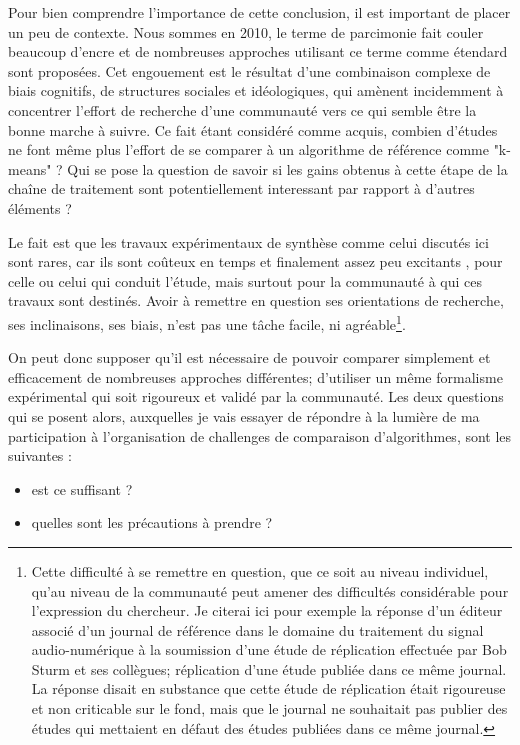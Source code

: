 Pour bien comprendre l'importance de cette conclusion, il est important de placer un peu de contexte. Nous sommes en 2010, le terme de parcimonie fait couler beaucoup d'encre et de nombreuses approches utilisant ce terme comme étendard sont proposées. Cet engouement est le résultat d'une combinaison complexe de biais cognitifs, de structures sociales et idéologiques, qui amènent incidemment à concentrer l'effort de recherche d'une communauté vers ce qui semble être la bonne marche à suivre. Ce fait étant considéré comme acquis, combien d'études ne font même plus l'effort de se comparer à un algorithme de référence comme "k-means" ? Qui se pose la question de savoir si les gains obtenus à cette étape de la chaîne de traitement sont potentiellement interessant par rapport à d'autres éléments ?

Le fait est que les travaux expérimentaux de synthèse comme celui discutés ici sont rares, car ils sont coûteux en temps et finalement assez peu \og excitants \fg, pour celle ou celui qui conduit l'étude, mais surtout pour la communauté à qui ces travaux sont destinés. Avoir à remettre en question ses orientations de recherche, ses inclinaisons, ses biais, n'est pas une tâche facile, ni agréable\footnote{Cette difficulté à se remettre en question, que ce soit au niveau individuel, qu'au niveau de la communauté peut amener des difficultés considérable pour l'expression du chercheur. Je citerai ici pour exemple la réponse d'un éditeur associé d'un journal de référence dans le domaine du traitement du signal audio-numérique à la soumission d'une étude de réplication effectuée par Bob Sturm et ses collègues; réplication d'une étude publiée dans ce même journal. La réponse disait en substance que cette étude de réplication était rigoureuse et non criticable sur le fond, mais que le journal ne souhaitait pas publier des études qui mettaient en défaut des études publiées dans ce même journal.}.

On peut donc supposer qu'il est nécessaire de pouvoir comparer simplement et efficacement de nombreuses approches différentes; d'utiliser un même formalisme expérimental qui soit rigoureux et validé par la communauté. Les deux questions qui se posent alors, auxquelles je vais essayer de répondre à la lumière de ma participation à l'organisation de challenges de comparaison d'algorithmes, sont les suivantes :
\begin{itemize}
  \item est ce suffisant ?
  \item quelles sont les précautions à prendre ?
\end{itemize}


